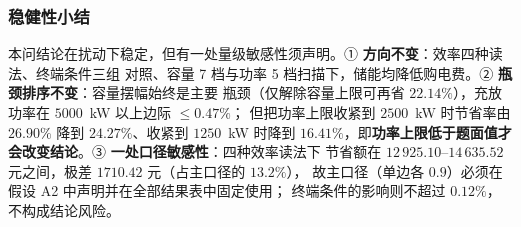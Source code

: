 \subsubsection{稳健性小结}

本问结论在扰动下稳定，但有一处量级敏感性须声明。① \textbf{方向不变}：效率四种读法、终端条件三组
对照、容量 7 档与功率 5 档扫描下，储能均降低购电费。② \textbf{瓶颈排序不变}：容量摆幅始终是主要
瓶颈（仅解除容量上限可再省 \(22.14\%\)），充放功率在 \(5000\)~kW 以上边际 \(\le0.47\%\)；
但把功率上限收紧到 \(2500\)~kW 时节省率由 \(26.90\%\) 降到 \(24.27\%\)、收紧到 \(1250\)~kW 时降到
\(16.41\%\)，即\textbf{功率上限低于题面值才会改变结论}。③ \textbf{一处口径敏感性}：四种效率读法下
节省额在 \(12\,925.10\)--\(14\,635.52\) 元之间，极差 \(1710.42\) 元（占主口径的 \(13.2\%\)），
故主口径（单边各 \(0.9\)）必须在假设 A2 中声明并在全部结果表中固定使用；
终端条件的影响则不超过 \(0.12\%\)，不构成结论风险。
